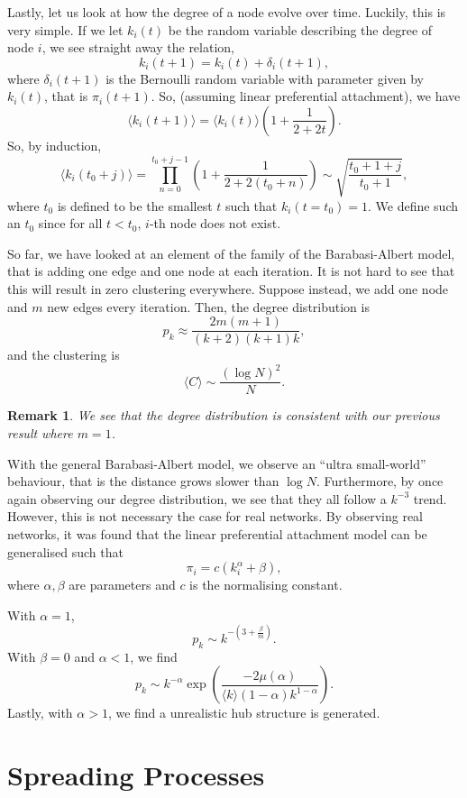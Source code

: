 \documentclass[
]{article}
\newtheorem*{remark}{Remark}
\theoremstyle{definition}
\begin{document}
Lastly, let us look at how the degree of a node evolve over time.
Luckily, this is very simple. If we let \(k_i(t)\) be the random
variable describing the degree of node \(i\), we see straight away the
relation, \[k_i(t + 1) = k_i(t) + \delta_i(t + 1),\] where
\(\delta_i(t + 1)\) is the Bernoulli random variable with parameter
given by \(k_i(t)\), that is \(\pi_i(t + 1)\). So, (assuming linear
preferential attachment), we have
\[\langle k_i(t + 1) \rangle = \langle k_i(t) \rangle\left(1 + \frac{1}{2 + 2t}\right).\]
So, by induction, \[\langle k_i(t_0 + j) \rangle = 
  \prod_{n = 0}^{t_0 + j - 1}\left( 1 + \frac{1}{2 + 2(t_0 + n)} \right)
  \sim \sqrt{\frac{t_0 + 1 + j}{t_0 + 1}},\] where \(t_0\) is defined to
be the smallest \(t\) such that \(k_i(t = t_0) = 1\). We define such an
\(t_0\) since for all \(t < t_0\), \(i\)-th node does not exist.

So far, we have looked at an element of the family of the
Barabasi-Albert model, that is adding one edge and one node at each
iteration. It is not hard to see that this will result in zero
clustering everywhere. Suppose instead, we add one node and \(m\) new
edges every iteration. Then, the degree distribution is
\[p_k \approx \frac{2m(m + 1)}{(k + 2)(k + 1)k},\] and the clustering is
\[\langle C \rangle \sim \frac{(\log N)^2}{N}.\]

\begin{remark}
  We see that the degree distribution is consistent with our previous result 
  where \(m = 1\).
\end{remark}

With the general Barabasi-Albert model, we observe an ``ultra
small-world'' behaviour, that is the distance grows slower than
\(\log N\). Furthermore, by once again observing our degree
distribution, we see that they all follow a \(k^{-3}\) trend. However,
this is not necessary the case for real networks. By observing real
networks, it was found that the linear preferential attachment model can
be generalised such that \[\pi_i = c(k_i^\alpha + \beta),\] where
\(\alpha, \beta\) are parameters and \(c\) is the normalising constant.

With \(\alpha = 1\),
\[p_k \sim k^{- \left(3 + \frac{\beta}{m}\right)}.\] With \(\beta = 0\)
and \(\alpha < 1\), we find
\[p_k \sim k^{-\alpha}\exp\left(\frac{-2 \mu(\alpha)}
{\langle k\rangle (1 - \alpha)k^{1 - \alpha}}\right).\] Lastly, with
\(\alpha > 1\), we find a unrealistic hub structure is generated.

\hypertarget{spreading-processes}{%
\section{Spreading Processes}\label{spreading-processes}}
\end{document}
